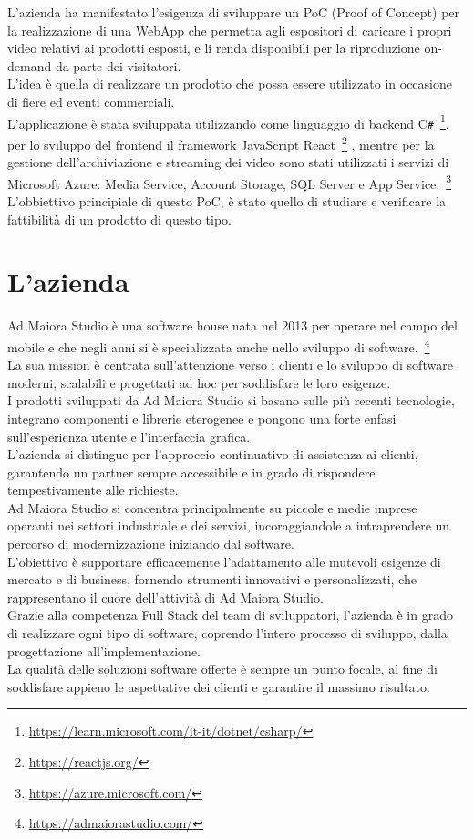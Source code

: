 L'azienda ha manifestato l'esigenza di sviluppare un PoC (Proof of Concept) per la realizzazione di una WebApp che permetta agli espositori di caricare i propri video relativi ai prodotti esposti, e li renda disponibili per la riproduzione on-demand da parte dei visitatori.\\
L'idea è quella di realizzare un prodotto che possa essere utilizzato in occasione di fiere ed eventi commerciali.\\
L'applicazione è stata sviluppata utilizzando come linguaggio di backend C\texttt{\#}~\footnote{\url{https://learn.microsoft.com/it-it/dotnet/csharp/}}, per lo sviluppo del frontend il framework JavaScript React~\footnote{\url{https://reactjs.org/}}  ,
mentre per la gestione dell'archiviazione e streaming dei video sono stati utilizzati i servizi di Microsoft Azure: Media Service, Account Storage, SQL Server e App Service.~\footnote{\url{https://azure.microsoft.com/}}\\
L'obbiettivo principiale di questo PoC, è stato quello di studiare e verificare la fattibilità di un prodotto di questo tipo.\\
\section{L'azienda}

Ad Maiora Studio è una software house nata nel 2013 per operare nel campo del mobile e che negli anni si è specializzata anche nello sviluppo di software.~\footnote{\url{https://admaiorastudio.com/}}\\
La sua mission è centrata sull'attenzione verso i clienti e lo sviluppo di software moderni, scalabili e progettati ad hoc per soddisfare le loro esigenze. \\
I prodotti sviluppati da Ad Maiora Studio si basano sulle più recenti tecnologie, integrano componenti e librerie eterogenee e pongono una forte enfasi sull'esperienza utente
 e l'interfaccia grafica.\\
L'azienda si distingue per l'approccio continuativo di assistenza ai clienti, 
garantendo un partner sempre accessibile e in grado di rispondere tempestivamente alle richieste. \\
Ad Maiora Studio si concentra principalmente su piccole e medie imprese operanti nei settori industriale e dei servizi, incoraggiandole a intraprendere un percorso di modernizzazione
 iniziando dal software.\\
L'obiettivo è supportare efficacemente l'adattamento alle mutevoli esigenze di mercato e di business, fornendo strumenti innovativi e personalizzati, che rappresentano il cuore dell'attività di Ad Maiora Studio.\\
Grazie alla competenza Full Stack del team di sviluppatori, l'azienda è in grado di realizzare ogni tipo di software, 
coprendo l'intero processo di sviluppo, dalla progettazione all'implementazione.\\
La qualità delle soluzioni software offerte è sempre un punto focale, al fine di soddisfare appieno le aspettative dei clienti e garantire il massimo risultato.



